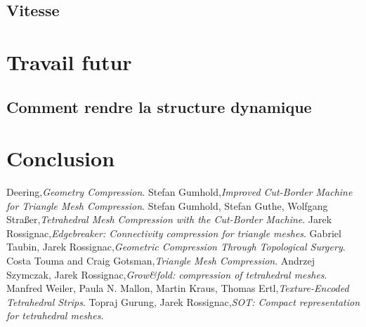 \documentclass[a4paper,11pt,openany]{article}
\begin{document}
\subsection{Vitesse}

\section{Travail futur}
\subsection{Comment rendre la structure dynamique}

\section{Conclusion}

\begin{thebibliography}{999}
Deering,\emph{Geometry Compression}. 
Stefan Gumhold,\emph{Improved Cut-Border Machine for Triangle Mesh Compression}. 
Stefan Gumhold, Stefan Guthe, Wolfgang Straßer,\emph{Tetrahedral Mesh Compression with the Cut-Border Machine}. 
Jarek Rossignac,\emph{Edgebreaker: Connectivity compression for triangle meshes}. 
Gabriel Taubin, Jarek Rossignac,\emph{Geometric Compression Through Topological Surgery}. 
Costa Touma and Craig Gotsman,\emph{Triangle Mesh Compression}. 
Andrzej Szymczak, Jarek Rossignac,\emph{Grow\&fold: compression of tetrahedral meshes}. 
Manfred Weiler, Paula N. Mallon, Martin Kraus, Thomas Ertl,\emph{Texture-Encoded Tetrahedral Strips}. 
Topraj Gurung, Jarek Rossignac,\emph{SOT: Compact representation for tetrahedral meshes}. 





\end{thebibliography}
\end{document}
